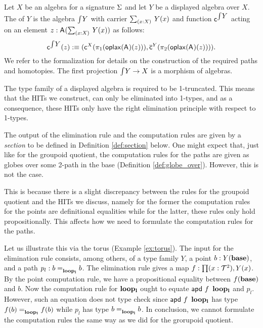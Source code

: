 \begin{definition}\label{def:total_alg}
Let $X$ be an algebra for a signature $\Sigma$ and let $Y$ be a
displayed algebra over $X$. The  of $Y$ is the
algebra $\textstyle \int_{}{Y}$ with carrier $\Sum (x : X). Y(x)$ and function
$\mathsf{c}^{\textstyle \int_{}{Y}}$ acting on an element $z
: \polyAct{\pointconstr}{\Sum (x : X). Y(x)}$ as follows:
\[
\mathsf{c}^{\textstyle \int_{}{Y}}(z) :\equiv
(\mathsf{c}^{X}(\pi_1(\mathsf{oplax}(\mathsf{A}^{})(z)))
,
\overline{\mathsf{c}}^{Y}(\pi_2(\mathsf{oplax}(\mathsf{A}^{})(z)))).
\]
We refer to the formalization for details on the construction of the
required paths and homotopies. The first projection $\textstyle \int_{}{Y} \rightarrow X$ is a morphism of algebras.
\end{definition}

\begin{remark}
The type family of a displayed algebra is required to be 1-truncated.
This means that the HITs we construct, can only be eliminated into
1-types, and as a consequence, these HITs only have the right
elimination principle with respect to 1-types.
\end{remark}

The output of the elimination rule and the computation rules are given by a \emph{section} to be defined in Definition \ref{def:section} below.
One might expect that, just like for the groupoid quotient, the computation rules for the paths
are given as globes over some 2-path in the base (Definition \ref{def:globe_over}).
However, this is not the case.

This is because there is a slight discrepancy between the rules for the groupoid quotient and the HITs we discuss,
namely for the former the computation rules for the points are definitional equalities
while for the latter, these rules only hold propositionally.
This affects how we need to formulate the computation rules for the paths.

Let us illustrate this via the torus (Example \ref{ex:torus}).
The input for the elimination rule consists, among others, of a type family $Y$, a point $b : Y(\operatorname{\mathbf{base}})$,
and a path $p_l : b =_{\operatorname{\mathbf{loop_l}}}^{} b$.
The elimination rule gives a map $f : \prod (x : \mathcal{T}^2) , Y(x)$.
By the point computation rule, we have a propositional equality between $f(\operatorname{\mathbf{base}})$ and $b$.
Now the computation rule for $\operatorname{\mathbf{loop_l}}$ ought to equate $\mathsf{apd} \ f \ \operatorname{\mathbf{loop_l}}$ and $p_l$.
However, such an equation does not type check since $\mathsf{apd} \ f \ \operatorname{\mathbf{loop_l}}$ has type $f(b) =_{\operatorname{\mathbf{loop_l}}}^{} f(b)$ while $p_l$ has type $b =_{\operatorname{\mathbf{loop_l}}}^{} b$.
In conclusion, we cannot formulate the computation rules the same way as we did for the grorupoid quotient.

